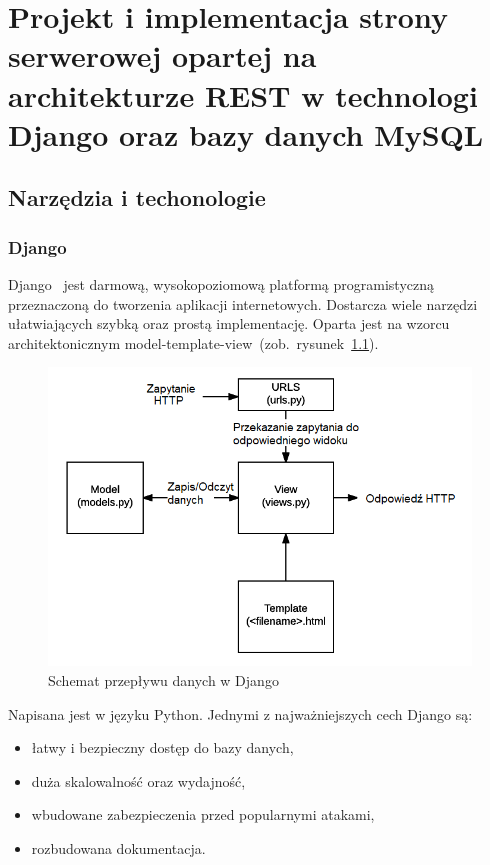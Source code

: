 
\chapter{Projekt i implementacja strony serwerowej opartej na architekturze REST w technologi Django oraz bazy danych MySQL}
\section{Narzędzia i techonologie}
\subsection{Django}
Django~\cite{Django} jest darmową, wysokopoziomową platformą programistyczną przeznaczoną do tworzenia aplikacji internetowych. Dostarcza wiele narzędzi ułatwiających szybką oraz prostą implementację. Oparta jest na wzorcu architektonicznym model-template-view~(zob.~rysunek~\ref{rys:django}). 

\begin{figure}[H]
	\centering\includegraphics[width=14cm]{figures/DjangoSchemat}
	\caption{Schemat przepływu danych w Django~\cite{DjangoSchemat}}\label{rys:django}
\end{figure}

Napisana jest w języku Python. Jednymi z najważniejszych cech Django są:
\begin{itemize}
	\item łatwy i bezpieczny dostęp do bazy danych,
	\item duża skalowalność oraz wydajność,
	\item wbudowane zabezpieczenia przed popularnymi atakami,
	\item rozbudowana dokumentacja.
\end{itemize}

